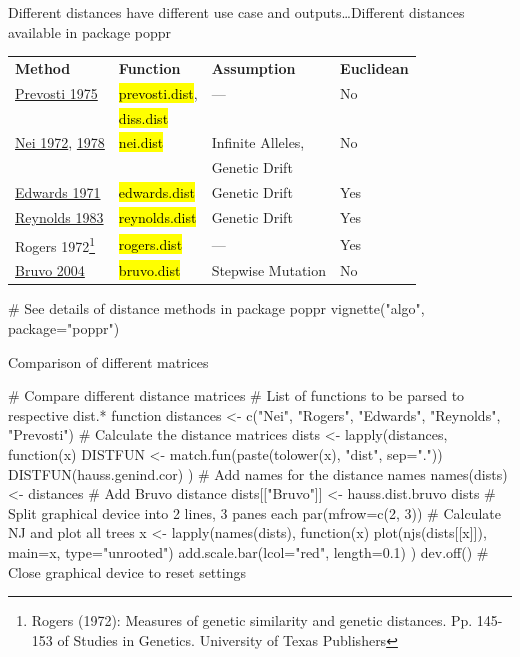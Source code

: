 \documentclass[compress, ucs, xelatex, 11pt, xcolor=svgnames,
  hyperref={
    bookmarks=true,
    unicode=true,
    colorlinks=true,
    pdftitle={Molecular data in R},
    plainpages=false,
    pdfauthor={Vojtech Zeisek},
    pdfsubject={Course about phylogeny and evolution in R},
    pdfcreator={XeLaTeX},
    pdfkeywords={R, evolution, phylogeny, molecular data},
    linkcolor=Tomato,
    anchorcolor=SaddleBrown,
    citecolor=Goldenrod,
    filecolor=DarkMagenta,
    menucolor=Sienna,
    urlcolor=DarkTurquoise,
    pdftex},
  url={hyphens, lowtilde} %
  ]{beamer}
\renewcommand{\texttt}[1]{\hl{\ttfamily #1}}
\begin{document}
\begin{frame}[fragile]{Different distances have different use case and outputs\ldots}{Different distances available in package poppr}
  \vfill
  \begin{tabular}{llll}
    \textbf{Method} & \textbf{Function} & \textbf{Assumption} & \textbf{Euclidean}\\
    \href{https://link.springer.com/article/10.1007/BF00831894}{Prevosti 1975} & \texttt{prevosti.dist}, & --- & \alert{No}\\
     & \texttt{diss.dist} & & \\
    \href{https://www.jstor.org/stable/2459777}{Nei 1972}, \href{http://www.genetics.org/content/89/3/583.short}{1978} & \texttt{nei.dist} & Infinite Alleles, & \alert{No}\\
     & & Genetic Drift & \\
    \href{https://www.jstor.org/stable/2528824}{Edwards 1971} & \texttt{edwards.dist} & Genetic Drift & Yes\\
    \href{http://www.genetics.org/node/324318.full}{Reynolds 1983} & \texttt{reynolds.dist} & Genetic Drift & Yes\\
    Rogers 1972\footnote{Rogers (1972): Measures of genetic similarity and genetic distances. Pp. 145-153 of Studies in Genetics. University of Texas Publishers} & \texttt{rogers.dist} & --- & Yes\\
    \href{http://onlinelibrary.wiley.com/doi/10.1111/j.1365-294X.2004.02209.x/full}{Bruvo 2004} & \texttt{bruvo.dist} & Stepwise Mutation & \alert{No}
  \end{tabular}
  \vfill
  \begin{spluscode}
    # See details of distance methods in package poppr
    vignette("algo", package="poppr")
  \end{spluscode}
  \vfill
\end{frame}

\begin{frame}[fragile]{Comparison of different matrices}
  \begin{spluscode}
    # Compare different distance matrices
    # List of functions to be parsed to respective dist.* function
    distances <- c("Nei", "Rogers", "Edwards", "Reynolds", "Prevosti")
    # Calculate the distance matrices
    dists <- lapply(distances, function(x) {
      DISTFUN <- match.fun(paste(tolower(x), "dist", sep="."))
      DISTFUN(hauss.genind.cor) })
    # Add names for the distance names
    names(dists) <- distances
    # Add Bruvo distance
    dists[["Bruvo"]] <- hauss.dist.bruvo
    dists
    # Split graphical device into 2 lines, 3 panes each
    par(mfrow=c(2, 3))
    # Calculate NJ and plot all trees
    x <- lapply(names(dists), function(x) {
      plot(njs(dists[[x]]), main=x, type="unrooted")
      add.scale.bar(lcol="red", length=0.1) })
    dev.off() # Close graphical device to reset settings
  \end{spluscode}
\end{frame}
\end{document}

